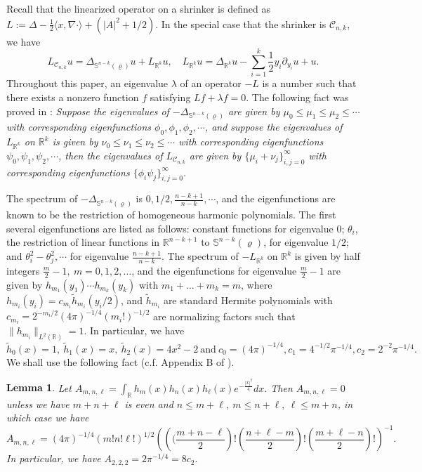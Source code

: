 \documentclass[11pt]{amsart}
\numberwithin{equation}{section}
\newtheorem{lemma}[theorem]{Lemma}
\numberwithin{equation}{section}
\newcommand{\bS}{\mathbb{S}}
\newcommand{\cC}{\mathcal{C}}
\newcommand{\R}{\mathbb{R}}
\newcommand{\pr}{\partial}
\begin{document}
	Recall that the linearized operator on a shrinker is defined as
	$L:=\Delta-\frac{1}{2}\langle x,\nabla\cdot\rangle+(|A|^2+1/2).$
	In the special case that the shrinker is $\cC_{n,k}$, we have
	\begin{equation}\label{EqL}
		L_{\cC_{n,k}} u= \Delta_{\bS^{n-k}(\varrho)} u +L_{\R^k}u,\quad L_{\R^k}u=\Delta_{\R^{k}} u -\sum_{i=1}^{k}\frac{1}{2}y_i\pr_{y_i}u+u.	
	\end{equation}
	Throughout this paper, an eigenvalue $\lambda$ of an operator $-L$ is a number such that there exists a nonzero function $f$ satisfying $Lf+\lambda f=0$. The following fact was proved in \cite[Section 5.2]{SunWangZhou20_MinmaxShrinker}: \emph{Suppose the eigenvalues of $-\Delta_{\bS^{n-k}(\varrho)}$ are given by $\mu_0\leq \mu_1\leq \mu_2\leq \cdots$ with corresponding eigenfunctions $\phi_0,\phi_1,\phi_2,\cdots$, and suppose the eigenvalues of $L_{\R^k}$ on $\R^{k}$ is given by $\nu_0\leq \nu_1\leq \nu_2\leq \cdots$ with corresponding eigenfunctions $\psi_0,\psi_1,\psi_2, \cdots$, then
		the eigenvalues of $L_{\cC_{n,k}}$ are given by $\{\mu_i+\nu_j\}_{i,j=0}^\infty$ with corresponding eigenfunctions $\{\phi_i\psi_j\}_{i,j=0}^\infty$.}
	
	The spectrum of $-\Delta_{\bS^{n-k}(\varrho)}$ is $0,1/2,\frac{n-k+1}{n-k},\cdots$, and the eigenfunctions are known to be the restriction of homogeneous harmonic polynomials. The first several eigenfunctions are listed as follows: constant functions for eigenvalue $0$; $\theta_i$, the restriction of linear functions in $\R^{n-k+1}$ to $\bS^{n-k}(\varrho)$, for eigenvalue $1/2$; and $\theta_i^2-\theta^2_j,\cdots$ for eigenvalue $\frac{n-k+1}{n-k}$. The spectrum of $-L_{\R^k}$ on $\R^{k}$ is given by half integers $\frac{m}{2}-1,\ m=0,1,2,\ldots$, and the eigenfunctions for eigenvalue $\frac{m}{2}-1$ are given by $h_{m_1}(y_1)\cdots h_{m_k}(y_k)$ with $m_1+\ldots+m_k=m$, where $h_{m_i}(y_i)=c_{m_i}\tilde h_{m_i}(y_i/2)$, and $\tilde h_{m_i}$ are standard Hermite polynomials with $c_{m_i}=2^{-m_i/2}(4\pi)^{-1/4}(m_i!)^{-1/2}$ are normalizing factors such that $\|h_{m_i}\|_{L^2(\R)}=1$. In particular, we have $$\tilde h_0(x)=1,\ \tilde h_1(x)=x,\ \tilde h_2(x)=4x^2-2 \mathrm{\ and\ } c_0=(4\pi)^{-1/4}, c_1=4^{-1/2}\pi^{-1/4}, c_2=2^{-2}\pi^{-1/4}.$$ We shall use the following fact (c.f. Appendix B of \cite{HV2}).
	\begin{lemma}\label{LmTriple}
		Let $A_{m,n,\ell}=\int_\R h_m(x)h_n(x)h_\ell(x)e^{-\frac{|x|^2}{4}}dx.$ Then $A_{m,n,\ell}=0$ unless we have $m+n+\ell$ is even and $n\leq m+\ell,\ m\leq n+\ell,\ \ell\leq m+n$, in which case we have $$A_{m,n,\ell}=(4\pi)^{-1/4}(m!n!\ell!)^{1/2}\left(\left((\frac{m+n-\ell}{2}\right)!\left(\frac{n+\ell-m}{2}\right)!\left(\frac{m+\ell-n}{2}\right)!\right)^{-1}.$$ In particular, we have $A_{2,2,2}=2\pi^{-1/4}=8c_2.$
	\end{lemma}
	
\end{document}
